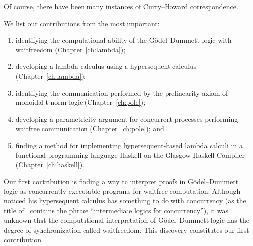 Of course, there have been many instances of Curry--Howard correspondence.

We list our contributions from the most important:
\begin{enumerate}
 \item identifying the computational ability of the
G\"odel--Dummett logic with waitfreedom (Chapter~\ref{ch:lambda});
 \item developing a lambda calculus using
       a hypersequent calculus (Chapter~\ref{ch:lambda});
 \item identifying the communication performed by the prelinearity axiom
       of monoidal t-norm logic (Chapter~\ref{ch:pole});
 \item developing a parametricity argument for
       concurrent processes performing waitfree communication
       (Chapter~\ref{ch:pole}); and
 \item finding a method for implementing hypersequent-based lambda calculi in a
       functional programming language Haskell on the Glasgow Haskell
       Compiler (Chapter~\ref{ch:haskell}).
\end{enumerate}

Our first contribution is finding a way to interpret proofs in
G\"odel--Dummett logic as
concurrently executable programs for waitfree computation.
Although \citet{avron91} noticed his hypersequent calculus has something
to do with concurrency (as the title of~\citep{avron91} contains the phrase
``intermediate logics for concurrency''), it was unknown that
the computational interpretation of G\"odel--Dummett logic has
the degree of synchronization called waitfreedom.  This discovery
constitutes our first contribution.

